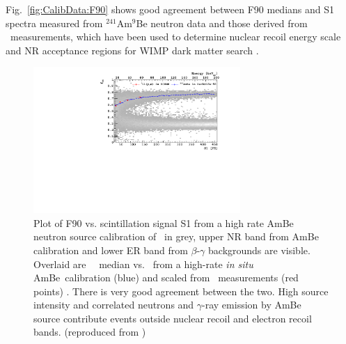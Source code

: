 Fig.~\ref{fig:CalibData:F90} shows good agreement between F90 medians and S1 spectra measured from $^{241}$Am$^9$Be neutron data and those derived from \SCENE\ measurements, which have been used to determine nuclear recoil energy scale and NR acceptance regions for WIMP dark matter search \cite{Agnes:2015gu, Agnes:2015_uar}.
\begin{figure}[htbp]
\centering
\includegraphics[width=0.7\textwidth]{./Figures/DSf-UArAmBeDMSStCut.pdf}
\caption{Plot of F90 vs. scintillation signal S1 from a high rate AmBe neutron source calibration of \dsf\ in grey, upper NR band from AmBe calibration and lower ER band from $\beta$-$\gamma$ backgrounds are visible. Overlaid are \FNinety\ \NR\ median vs. \SOne\ from a high-rate {\it in situ} AmBe\ calibration (blue) and scaled from \SCENE\ measurements (red points) \cite{Cao:2015ks}. There is very good agreement between the two.  High source intensity and correlated neutrons and $\gamma$-ray emission by AmBe source contribute events outside nuclear recoil and electron recoil bands. (reproduced from \cite{Agnes:2015_uar})\label{fig:CalibData:F90}\label{fig:DSf-UArAmBeDMS}} 
\end{figure}


